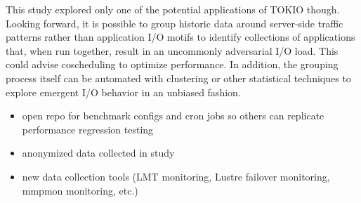 This study explored only one of the potential applications of TOKIO though.  Looking forward, it is possible to group historic data around server-side traffic patterns rather than application I/O motifs to identify collections of applications that, when run together, result in an uncommonly adversarial I/O load.  This could advise coscheduling to optimize performance.  In addition, the grouping process itself can be automated with clustering or other statistical techniques to explore emergent I/O behavior in an unbiased fashion.


\begin{itemize}
\item open repo for benchmark configs and cron jobs so others can replicate
performance regression testing
\item anonymized data collected in study
\item new data collection tools (LMT monitoring, Lustre failover monitoring,
mmpmon monitoring, etc.)
\end{itemize}

